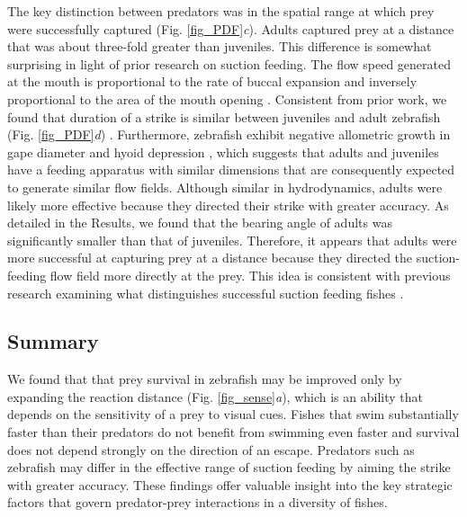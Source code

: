 \documentclass[]{rsos}%
\begin{document}
The key distinction between predators was in the spatial range at which prey were successfully captured (Fig. \ref{fig_PDF}\textit{c}).
Adults captured prey at a distance that was about three-fold greater than juveniles.
This difference is somewhat surprising in light of prior research on suction feeding. 
The flow speed generated at the mouth is proportional to the rate of buccal expansion and inversely proportional to the area of the mouth opening \cite{Holzman:2008jc,Muller:1982p335}.
Consistent from prior work, we found that duration of a strike is similar between juveniles and adult zebrafish (Fig. \ref{fig_PDF}\textit{d}) \cite{Hernandez:2000uma}.
Furthermore, zebrafish exhibit negative allometric growth in gape diameter and hyoid depression \cite{Hernandez:2000uma}, which suggests that adults and juveniles have a feeding apparatus with similar dimensions that are consequently expected to generate similar flow fields.
Although similar in hydrodynamics, adults were likely more effective because they directed their strike with greater accuracy. 
As detailed in the Results, we found that the bearing angle of adults was significantly smaller than that of juveniles. 
Therefore, it appears that adults were more successful at capturing prey at a distance because they directed the suction-feeding flow field more directly at the prey.
This idea is consistent with previous research examining what distinguishes successful suction feeding fishes \cite{Kane:2014bh}.


\subsection*{Summary} 

We found that that prey survival in zebrafish may be improved only by expanding the reaction distance (Fig. \ref{fig_sense}\textit{a}), which is an ability that depends on the sensitivity of a prey to visual cues. 
Fishes that swim substantially faster than their predators do not benefit from swimming even faster and survival does not depend strongly on the direction of an escape.
Predators such as zebrafish may differ in the effective range of suction feeding by aiming the strike with greater accuracy.
These findings offer valuable insight into the key strategic factors that govern predator-prey interactions in a diversity of fishes. 


\end{document}
